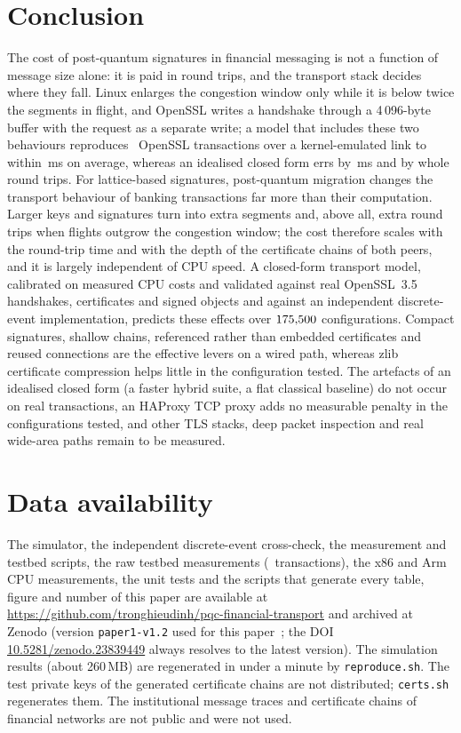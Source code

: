 \documentclass[preprint,12pt]{elsarticle}
\newcommand{\ms}{\,ms\xspace}
\begin{document}
\section{Conclusion}
\label{sec:conclusion}
The cost of post-quantum signatures in financial messaging is not a function of message size alone: it is paid in round trips, and the transport stack decides where they fall. Linux enlarges the congestion window only while it is below twice the segments in flight, and OpenSSL writes a handshake through a 4\,096-byte buffer with the request as a separate write; a model that includes these two behaviours reproduces \tbNTrans\ OpenSSL transactions over a kernel-emulated link to within \tbMaeStack\ms on average, whereas an idealised closed form errs by \tbMaeIdeal\ms and by whole round trips. For lattice-based signatures, post-quantum migration changes the transport behaviour of banking transactions far more than their computation. Larger keys and signatures turn into extra segments and, above all, extra round trips when flights outgrow the congestion window; the cost therefore scales with the round-trip time and with the depth of the certificate chains of both peers, and it is largely independent of CPU speed. A closed-form transport model, calibrated on measured CPU costs and validated against real OpenSSL~3.5 handshakes, certificates and signed objects and against an independent discrete-event implementation, predicts these effects over $175{,}500$ configurations. Compact signatures, shallow chains, referenced rather than embedded certificates and reused connections are the effective levers on a wired path, whereas zlib certificate compression helps little in the configuration tested. The artefacts of an idealised closed form (a faster hybrid suite, a flat classical baseline) do not occur on real transactions, an HAProxy TCP proxy adds no measurable penalty in the configurations tested, and other TLS stacks, deep packet inspection and real wide-area paths remain to be measured.

\section*{Data availability}
The simulator, the independent discrete-event cross-check, the measurement and testbed scripts, the raw testbed measurements (\tbNTrans\ transactions), the x86 and Arm CPU measurements, the unit tests and the scripts that generate every table, figure and number of this paper are available at \url{https://github.com/tronghieudinh/pqc-financial-transport} and archived at Zenodo (version \texttt{paper1-v1.2} used for this paper~\cite{dinh2026artifact}; the DOI \href{https://doi.org/10.5281/zenodo.23839449}{10.5281/zenodo.23839449} always resolves to the latest version). The simulation results (about 260\,MB) are regenerated in under a minute by \texttt{reproduce.sh}. The test private keys of the generated certificate chains are not distributed; \texttt{certs.sh} regenerates them. The institutional message traces and certificate chains of financial networks are not public and were not used.
\end{document}
